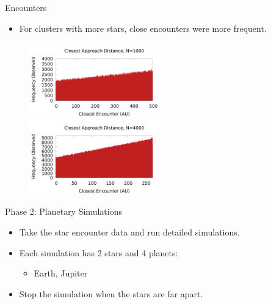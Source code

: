 \documentclass{beamer}
\begin{document}
\begin{frame}{Encounters}
    \begin{itemize}
        \item For clusters with more stars, close encounters were more frequent.
    \end{itemize}
    \begin{figure}
        \centering
        \includegraphics[width=2.25in]{slides/encounter_distance_1000} \\
        \includegraphics[width=2.25in]{slides/encounter_distance_4000}
    \end{figure}
\end{frame}

\begin{frame}{Phase 2: Planetary Simulations}
    \begin{itemize}
        \item Take the star encounter data and run detailed simulations.
        \item Each simulation has 2 stars and 4 planets:
            \begin{itemize}
            \item Earth, Jupiter
            \end{itemize}
        \item Stop the simulation when the stars are far apart.
    \end{itemize}
\end{frame}
\end{document}
